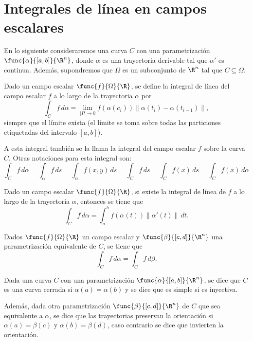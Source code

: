 \documentclass[a4,11pt]{aleph-notas}
\begin{document}
\encabezado

\section{Integrales de línea en campos escalares}

En lo siguiente consideraremos una curva $C$ con una parametrización $\func{\alpha}{[a,b]}{\R^n}$, donde $\alpha$ es una trayectoria derivable tal que $\alpha'$ es continua. Además, supondremos que $\Omega$ es un subconjunto de $\R^n$ tal que $C\subseteq \Omega$.

\begin{defi}
    Dado un campo escalar $\func{f}{\Omega}{\R}$, se define la integral de línea del campo escalar $f$ a lo largo de la trayectoria $\alpha$ por
    \[
        \int_C f\, d\alpha
        = \lim_{|P|\to 0} f(\alpha(c_i)) \| \alpha(t_i)-\alpha(t_{i-1}) \|,
    \]
    siempre que el límite exista (el límite se toma sobre todas las particiones etiquetadas del intervalo $[a,b]$).
\end{defi}

\begin{advertencia}
    A esta integral también se la llama la integral del campo escalar $f$ sobre la curva $C$. Otras notaciones para esta integral son:
    \[
        \int_C f \,d\alpha = \int_\alpha f \,ds
        = \int_\alpha f(x,y) \,ds
        = \int_C f \,ds
        = \int_C f(x) \,ds
        = \int_C f(x) \,d\alpha
    \]
\end{advertencia}

\begin{teo}
    Dado un campo escalar $\func{f}{\Omega}{\R}$, si existe la integral de línea de $f$ a lo largo de la trayectoria $\alpha$, entonces se tiene que
    \[
        \int_C f \,d\alpha
        =\int_a^b f(\alpha(t))\|\alpha'(t)\|\,dt.
    \]
\end{teo}

\begin{prop}
    Dados $\func{f}{\Omega}{\R}$ un campo escalar y $\func{\beta}{[c,d]}{\R^n}$ una parametrización equivalente de $C$, se tiene que
    \[
        \int_C f \,d\alpha = \int_C f \,d\beta.
    \]
\end{prop}

\begin{defi}
    Dada una curva $C$ con una parametrización $\func{\alpha}{[a,b]}{\R^n}$,
    se dice que $C$ es una curva cerrada si $\alpha(a)=\alpha(b)$ y se dice que es simple si es inyectiva.

    Además, dada otra parametrización $\func{\beta}{[c,d]}{\R^n}$ de $C$ que sea equivalente a $\alpha$, se dice que las trayectorias preservan la orientación si $\alpha(a)=\beta(c)$ y $\alpha(b)=\beta(d)$, caso contrario se dice que invierten la orientación.
\end{defi}
\end{document}
